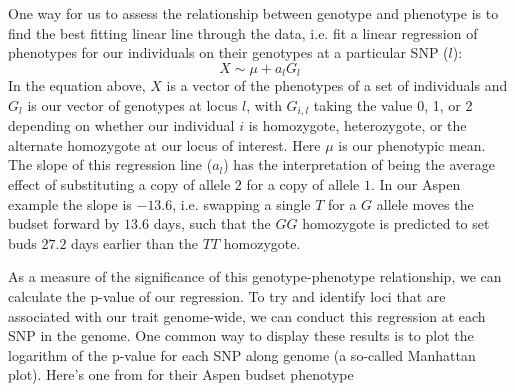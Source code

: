 One way for us to assess the relationship between
genotype and phenotype is to find the best fitting linear line through the data, i.e. fit a linear regression of
phenotypes for our individuals on their genotypes at a particular SNP ($l$):
\begin{equation}
X \sim \mu + a_l G_{l}
\end{equation}
In the equation above, $X$ is a vector of the phenotypes of a set of individuals and $G_{l}$ is our vector of genotypes at locus $l$, with $G_{i,l}$ taking the value 0, 1, or 2 depending on whether our individual $i$ is homozygote, heterozygote, or the alternate homozygote at our locus of interest. Here $\mu$ is our phenotypic mean. The slope of this regression line ($a_l$) has the interpretation of being the average
effect of substituting a copy of allele $2$ for a copy of allele
$1$. In our Aspen example the slope is $-13.6$, i.e. swapping a single $T$ for a $G$ allele
moves the budset forward by $13.6$ days, such that the $GG$ homozygote
is predicted to set buds $27.2$ days earlier than the $TT$ homozygote.   


As a measure of the significance of this genotype-phenotype relationship, we can
calculate the p-value of our regression. To try and identify loci
that are associated with our trait genome-wide, we can conduct this
regression at each SNP in the genome. One common way to display these
results is to plot the logarithm of the p-value for each SNP along
genome (a so-called Manhattan plot). Here's one from 
\citet{wang:18} for their Aspen budset phenotype


